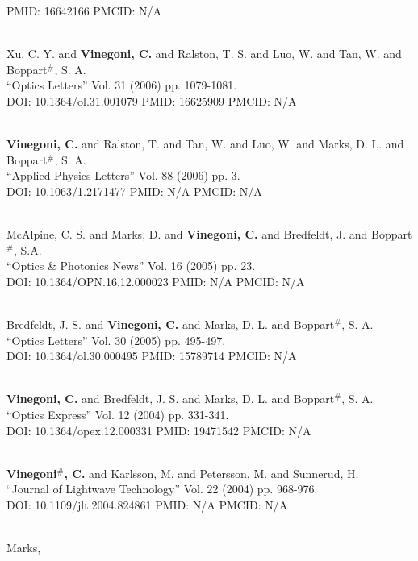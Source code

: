 PMID: 16642166 PMCID: N/A\item {} \\ Xu, C. Y. and {\bf Vinegoni, C.} and Ralston, T. S. and Luo, W. and Tan, W. and Boppart$^\#$, S. A. \\ ``Optics Letters'' Vol. 31 (2006) pp. 1079-1081. \\ DOI: 10.1364/ol.31.001079 PMID: 16625909 PMCID: N/A\item {} \\ {\bf Vinegoni, C.} and Ralston, T. and Tan, W. and Luo, W. and Marks, D. L. and Boppart$^\#$, S. A. \\ ``Applied Physics Letters'' Vol. 88 (2006) pp. 3. \\ DOI: 10.1063/1.2171477 PMID: N/A PMCID: N/A\item {} \\ McAlpine, C. S. and Marks, D. and {\bf Vinegoni, C.} and Bredfeldt, J. and Boppart$^\#$, S.A. \\ ``Optics & Photonics News'' Vol. 16 (2005) pp. 23. \\ DOI: 10.1364/OPN.16.12.000023 PMID: N/A PMCID: N/A\item {} \\ Bredfeldt, J. S. and {\bf Vinegoni, C.} and Marks, D. L. and Boppart$^\#$, S. A. \\ ``Optics Letters'' Vol. 30 (2005) pp. 495-497. \\ DOI: 10.1364/ol.30.000495 PMID: 15789714 PMCID: N/A\item {} \\ {\bf Vinegoni, C.} and Bredfeldt, J. S. and Marks, D. L. and Boppart$^\#$, S. A. \\ ``Optics Express'' Vol. 12 (2004) pp. 331-341. \\ DOI: 10.1364/opex.12.000331 PMID: 19471542 PMCID: N/A\item {} \\ {\bf Vinegoni$^\#$, C.} and Karlsson, M. and Petersson, M. and Sunnerud, H. \\ ``Journal of Lightwave Technology'' Vol. 22 (2004) pp. 968-976. \\ DOI: 10.1109/jlt.2004.824861 PMID: N/A PMCID: N/A\item {} \\ Marks, 